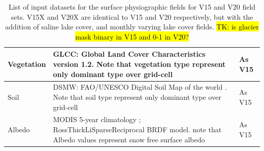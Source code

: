 \documentclass[hess, twostagejnl]{copernicus}
\begin{document}
\begin{table}
\begin{tabularx}{\textwidth}{lXX}
		\hline 
		Vegetation & GLCC: Global Land Cover Characteristics version 1.2. Note that vegetation type represent only dominant type over grid-cell & As V15 \\ 
		\hline
		 Soil & DSMW: FAO/UNESCO Digital Soil Map of the world \citep{FAO}. Note that soil type represent only dominant type over grid-cell & As V15 \\ 
		 \hline 
		 Albedo & MODIS 5-year climatology \citep{SCHAAF2002135}; RossThickLiSparseReciprocal BRDF model. note that Albedo values represent snow free surface albedo & As V15 \\ 
		\bottomrule
	\end{tabularx}
	\caption{List of input datasets for the surface physiographic fields for V15 and V20 field sets. V15X and V20X are identical to V15 and V20 respectively, but with the addition of saline lake cover, and monthly varying lake cover fields. \hl{TK: is glacier mask binary in V15 and 0-1 in V20?}}
	\label{tab:datasources}
\end{table}
\end{document}
